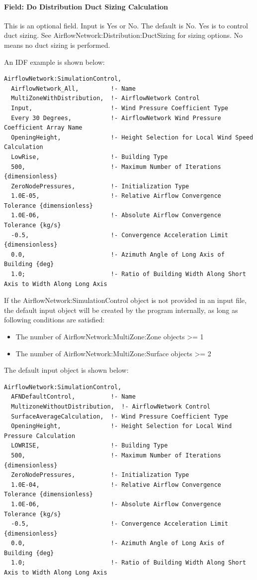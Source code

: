 \paragraph{Field: Do Distribution Duct Sizing Calculation}\label{do-distribution-duct-sizing-calculation}

This is an optional field. Input is Yes or No. The default is No. Yes is to control duct sizing. See AirflowNetwork:Distribution:DuctSizing for sizing options. No means no duct sizing is performed.


An IDF example is shown below:

\begin{lstlisting}
AirflowNetwork:SimulationControl,
  AirflowNetwork_All,         !- Name
  MultiZoneWithDistribution,  !- AirflowNetwork Control
  Input,                      !- Wind Pressure Coefficient Type
  Every 30 Degrees,           !- AirflowNetwork Wind Pressure Coefficient Array Name
  OpeningHeight,              !- Height Selection for Local Wind Speed Calculation
  LowRise,                    !- Building Type
  500,                        !- Maximum Number of Iterations {dimensionless}
  ZeroNodePressures,          !- Initialization Type
  1.0E-05,                    !- Relative Airflow Convergence Tolerance {dimensionless}
  1.0E-06,                    !- Absolute Airflow Convergence Tolerance {kg/s}
  -0.5,                       !- Convergence Acceleration Limit {dimensionless}
  0.0,                        !- Azimuth Angle of Long Axis of Building {deg}
  1.0;                        !- Ratio of Building Width Along Short Axis to Width Along Long Axis
\end{lstlisting}

If the AirflowNetwork:SimulationControl object is not provided in an input file, the default input object will be created by the program internally, as long as following conditions are satisfied:
\begin{itemize}
\item The number of AirflowNetwork:MultiZone:Zone objects >= 1
\item The number of AirflowNetwork:MultiZone:Surface objects >= 2
\end{itemize}
The default input object is shown below:

\begin{lstlisting}
AirflowNetwork:SimulationControl,
  AFNDefaultControl,          !- Name
  MultizoneWithoutDistribution,  !- AirflowNetwork Control
  SurfaceAverageCalculation,  !- Wind Pressure Coefficient Type
  OpeningHeight,              !- Height Selection for Local Wind Pressure Calculation
  LOWRISE,                    !- Building Type
  500,                        !- Maximum Number of Iterations {dimensionless}
  ZeroNodePressures,          !- Initialization Type
  1.0E-04,                    !- Relative Airflow Convergence Tolerance {dimensionless}
  1.0E-06,                    !- Absolute Airflow Convergence Tolerance {kg/s}
  -0.5,                       !- Convergence Acceleration Limit {dimensionless}
  0.0,                        !- Azimuth Angle of Long Axis of Building {deg}
  1.0;                        !- Ratio of Building Width Along Short Axis to Width Along Long Axis
\end{lstlisting}

